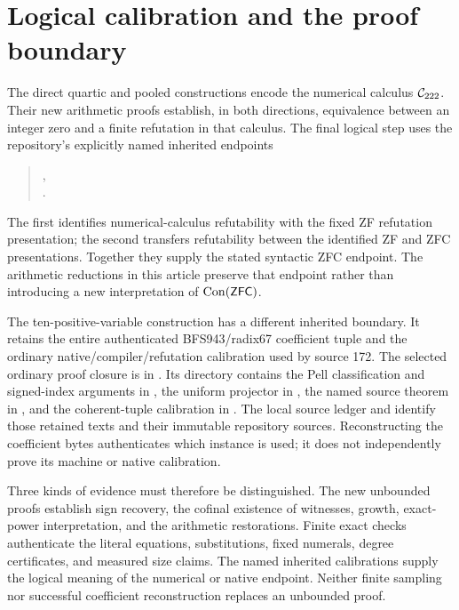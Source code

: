\section{Logical calibration and the proof boundary}
\label{sec:boundary}

The direct quartic and pooled constructions encode the numerical calculus
$\mathcal C_{222}$.  Their new arithmetic proofs establish, in both directions,
equivalence between an integer zero and a finite refutation in that
calculus.  The final logical step uses the repository's explicitly named
inherited endpoints
\begin{quote}\small
{},\\
.
\end{quote}
The first identifies numerical-calculus refutability with the fixed ZF
refutation presentation; the second transfers refutability between the
identified ZF and ZFC presentations.  Together they supply the stated
syntactic ZFC endpoint.  The arithmetic reductions in this article preserve
that endpoint rather than introducing a new interpretation of
$\operatorname{Con}(\mathsf{ZFC})$.

The ten-positive-variable construction has a different inherited boundary.
It retains the entire authenticated BFS943/radix67 coefficient tuple and
the ordinary native/compiler/refutation calibration used by source 172.
The selected ordinary proof closure is in
.  Its
 directory
contains the Pell classification and signed-index arguments in
, the uniform projector in
, the named source theorem in
, and the coherent-tuple calibration in
.  The local source ledger
 and
 identify those retained texts and their
immutable repository sources.  Reconstructing the coefficient bytes
authenticates which instance is used; it does not independently prove its
machine or native calibration.

Three kinds of evidence must therefore be distinguished.  The new
unbounded proofs establish sign recovery, the cofinal existence of
witnesses, growth, exact-power interpretation, and the arithmetic
restorations.  Finite exact checks authenticate the literal equations,
substitutions, fixed numerals, degree certificates, and measured size
claims.  The named inherited calibrations supply the logical meaning of
the numerical or native endpoint.  Neither finite sampling nor successful
coefficient reconstruction replaces an unbounded proof.

